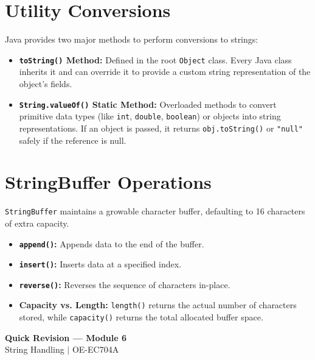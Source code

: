 \documentclass[12pt,a4paper]{article}
\begin{document}
\section{Utility Conversions}

Java provides two major methods to perform conversions to strings:
\begin{itemize}[leftmargin=*, itemsep=3.5pt]
  \item \textbf{\texttt{toString()} Method:} Defined in the root \texttt{Object} class. Every Java class inherits it and can override it to provide a custom string representation of the object's fields.
  \item \textbf{\texttt{String.valueOf()} Static Method:} Overloaded methods to convert primitive data types (like \texttt{int}, \texttt{double}, \texttt{boolean}) or objects into string representations. If an object is passed, it returns \texttt{obj.toString()} or \texttt{"null"} safely if the reference is null.
\end{itemize}

\section{StringBuffer Operations}

\texttt{StringBuffer} maintains a growable character buffer, defaulting to 16 characters of extra capacity.
\begin{itemize}[leftmargin=*, itemsep=3.5pt]
  \item \textbf{\texttt{append()}:} Appends data to the end of the buffer.
  \item \textbf{\texttt{insert()}:} Inserts data at a specified index.
  \item \textbf{\texttt{reverse()}:} Reverses the sequence of characters in-place.
  \item \textbf{Capacity vs. Length:} \texttt{length()} returns the actual number of characters stored, while \texttt{capacity()} returns the total allocated buffer space.
\end{itemize}

\newpage
\begin{center}
  {\large\bfseries\color{myred} Quick Revision --- Module 6}\\[3pt]
  {\small\color{mydark} String Handling $|$ OE-EC704A}
\end{center}
\noindent{\color{myred}\rule{\linewidth}{1.2pt}}
\vspace{4pt}
\end{document}
